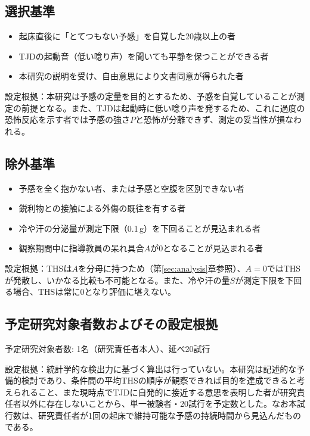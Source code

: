 \documentclass{kyodai-protocol}
\begin{document}
\subsection{選択基準}
\begin{itemize}
\item 起床直後に「とてつもない予感」を自覚した20歳以上の者
\item TJDの起動音（低い唸り声）を聞いても平静を保つことができる者
\item 本研究の説明を受け、自由意思により文書同意が得られた者
\end{itemize}

設定根拠：本研究は予感の定量を目的とするため、予感を自覚していることが測定の前提となる。また、TJDは起動時に低い唸り声を発するため、これに過度の恐怖反応を示す者では予感の強さ$P$と恐怖が分離できず、測定の妥当性が損なわれる。

\subsection{除外基準}
\begin{itemize}
\item 予感を全く抱かない者、または予感と空腹を区別できない者
\item 鋭利物との接触による外傷の既往を有する者
\item 冷や汗の分泌量が測定下限（0.1\,g）を下回ることが見込まれる者
\item 観察期間中に指導教員の呆れ具合$A$が0となることが見込まれる者
\end{itemize}

設定根拠：THSは$A$を分母に持つため（第\ref{sec:analysis}章参照）、$A = 0$ではTHSが発散し、いかなる比較も不可能となる。また、冷や汗の量$S$が測定下限を下回る場合、THSは常に0となり評価に堪えない。

\subsection{予定研究対象者数およびその設定根拠}

予定研究対象者数: 1名（研究責任者本人）、延べ20試行

設定根拠：統計学的な検出力に基づく算出は行っていない。本研究は記述的な予備的検討であり、条件間の平均THSの順序が観察できれば目的を達成できると考えられること、また現時点でTJDに自発的に接近する意思を表明した者が研究責任者以外に存在しないことから、単一被験者・20試行を予定数とした。なお本試行数は、研究責任者が1回の起床で維持可能な予感の持続時間から見込んだものである。
\end{document}
